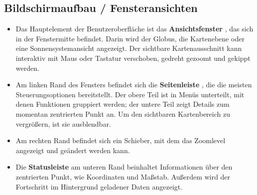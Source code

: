 \documentclass[10pt]{scrreprt}
\begin{document}
\subsection{Bildschirmaufbau / Fensteransichten}
\begin{itemize}
	\item Das Hauptelement der Benutzeroberfläche ist das \textbf{Ansichtsfenster}  , das sich in der Fenstermitte befindet. Darin wird der Globus, die Kartenebene oder eine Sonnensystemansicht angezeigt. Der sichtbare Kartenausschnitt kann interaktiv mit Maus oder Tastatur verschoben, gedreht gezoomt und gekippt werden.
	\item Am linken Rand des Fensters befindet sich die \textbf{Seitenleiste} , die die meisten Steuerungsoptionen bereitstellt. Der obere Teil ist in Menüs unterteilt, mit denen Funktionen gruppiert werden; der untere Teil zeigt Details zum momentan zentrierten Punkt an. Um den sichtbaren Kartenbereich zu vergrößern, ist sie ausblendbar.
	\item Am rechten Rand  befindet sich ein Schieber, mit dem das Zoomlevel angezeigt und geändert werden kann.
	\item Die \textbf{Statusleiste}  am unteren Rand beinhaltet Informationen über den zentrierten Punkt, wie Koordinaten und Maßstab. Außerdem wird der Fortschritt im Hintergrund geladener Daten angezeigt.
\end{itemize}
\end{document}
